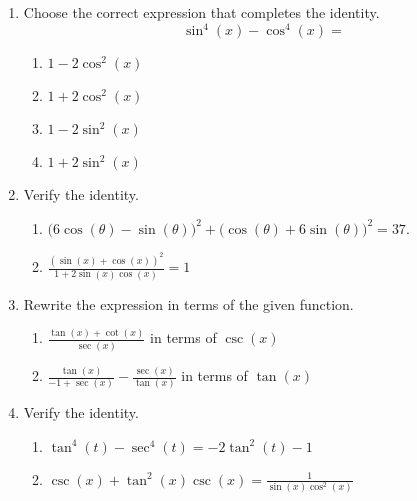 \begin{enumerate}
\item Choose the correct expression that completes the identity.
$$\sin^4(x)-\cos^4(x)=$$
\begin{enumerate}
\item $1-2\cos^2(x)$
\item $1+2\cos^2(x)$
\item $1-2\sin^2(x)$
\item $1+2\sin^2(x)$
\end{enumerate}
\vfill

\item Verify the identity.

\begin{enumerate}
\item $\Big(6\cos(\theta)-\sin(\theta)\Big)^2+\Big(\cos(\theta)+6\sin(\theta)\Big)^2=37$.
\vfill
\item $\displaystyle \frac{(\sin(x)+\cos(x))^2}{1+2\sin(x)\cos(x)}=1$
\vfill
\end{enumerate}

\newpage


\item Rewrite the expression in terms of the given function.
\begin{enumerate}
\item $\displaystyle \frac{\tan(x)+\cot(x)}{\sec(x)}$ in terms of $\csc(x)$
\vfill
\item $\displaystyle \frac{\tan(x)}{-1+\sec(x)}-\frac{\sec(x)}{\tan(x)}$ in terms of $\tan(x)$
\vfill

\end{enumerate}

\newpage
\item Verify the identity.

\begin{enumerate}
\item $\tan^4(t)-\sec^4(t)=-2\tan^2(t)-1$
\vfill
\item $\displaystyle \csc(x)+\tan^2(x)\csc(x)=\frac{1}{\sin(x)\cos^2(x)}$
\vfill
\end{enumerate}






\end{enumerate}
